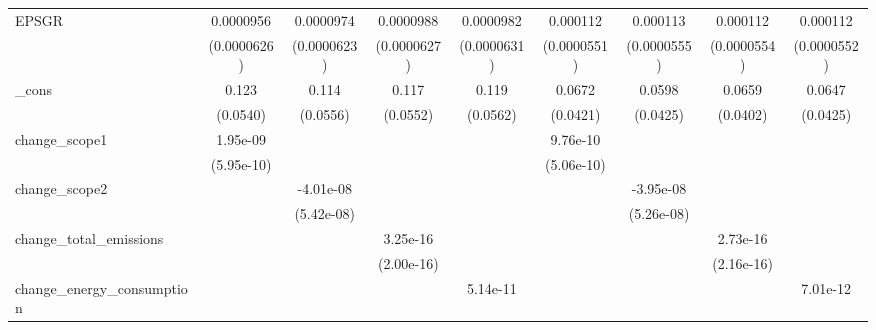 \begin{table}[htbp]
\begin{tabular}{l*{8}{c}}
EPSGR               &   0.0000956         &   0.0000974         &   0.0000988         &   0.0000982         &    0.000112\sym{*}  &    0.000113\sym{*}  &    0.000112\sym{*}  &    0.000112\sym{*}  \\
                    & (0.0000626)         & (0.0000623)         & (0.0000627)         & (0.0000631)         & (0.0000551)         & (0.0000555)         & (0.0000554)         & (0.0000552)         \\
\_cons              &       0.123\sym{**} &       0.114\sym{*}  &       0.117\sym{*}  &       0.119\sym{*}  &      0.0672         &      0.0598         &      0.0659         &      0.0647         \\
                    &    (0.0540)         &    (0.0556)         &    (0.0552)         &    (0.0562)         &    (0.0421)         &    (0.0425)         &    (0.0402)         &    (0.0425)         \\
change\_scope1       &    1.95e-09\sym{***}&                     &                     &                     &    9.76e-10\sym{*}  &                     &                     &                     \\
                    &  (5.95e-10)         &                     &                     &                     &  (5.06e-10)         &                     &                     &                     \\
change\_scope2       &                     &   -4.01e-08         &                     &                     &                     &   -3.95e-08         &                     &                     \\
                    &                     &  (5.42e-08)         &                     &                     &                     &  (5.26e-08)         &                     &                     \\
change\_total\_emissions&                     &                     &    3.25e-16         &                     &                     &                     &    2.73e-16         &                     \\
                    &                     &                     &  (2.00e-16)         &                     &                     &                     &  (2.16e-16)         &                     \\
change\_energy\_consumption&                     &                     &                     &    5.14e-11         &                     &                     &                     &    7.01e-12         \\

\end{tabular}
\end{table}
